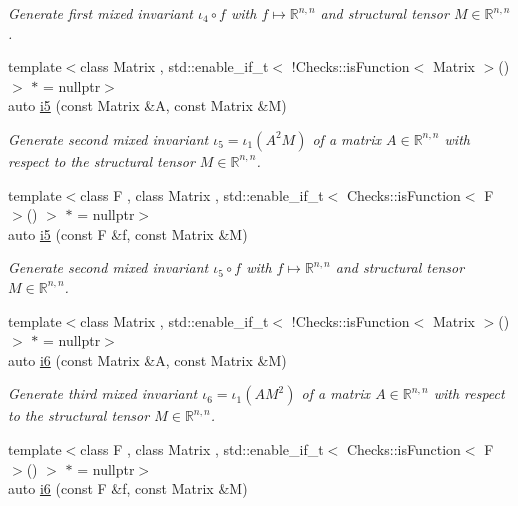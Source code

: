 \begin{DoxyCompactItemize}
\begin{DoxyCompactList}\small\item\em Generate first mixed invariant $ \iota_4\circ f $ with $f\mapsto\mathbb{R}^{n,n}$ and structural tensor $M\in\mathbb{R}^{n,n}$. \end{DoxyCompactList}\item 
{\footnotesize template$<$class Matrix , std\-::enable\-\_\-if\-\_\-t$<$ !\-Checks\-::is\-Function$<$ Matrix $>$() $>$ $\ast$  = nullptr$>$ }\\auto \hyperlink{group__InvariantGroup_ga848a942e66a1e2bd750d5e373e9a384e}{i5} (const Matrix \&A, const Matrix \&M)
\begin{DoxyCompactList}\small\item\em Generate second mixed invariant $ \iota_5=\iota_1(A^2M) $ of a matrix $A\in\mathbb{R}^{n,n}$ with respect to the structural tensor $M\in\mathbb{R}^{n,n}$. \end{DoxyCompactList}\item 
{\footnotesize template$<$class F , class Matrix , std\-::enable\-\_\-if\-\_\-t$<$ Checks\-::is\-Function$<$ F $>$() $>$ $\ast$  = nullptr$>$ }\\auto \hyperlink{group__InvariantGroup_ga5dcdde79eb75b3f69652f939ea8ef029}{i5} (const F \&f, const Matrix \&M)
\begin{DoxyCompactList}\small\item\em Generate second mixed invariant $ \iota_5\circ f $ with $f\mapsto\mathbb{R}^{n,n}$ and structural tensor $M\in\mathbb{R}^{n,n}$. \end{DoxyCompactList}\item 
{\footnotesize template$<$class Matrix , std\-::enable\-\_\-if\-\_\-t$<$ !\-Checks\-::is\-Function$<$ Matrix $>$() $>$ $\ast$  = nullptr$>$ }\\auto \hyperlink{group__InvariantGroup_gaa0c4c64776bb36124d6b5af013ff14b1}{i6} (const Matrix \&A, const Matrix \&M)
\begin{DoxyCompactList}\small\item\em Generate third mixed invariant $ \iota_6=\iota_1(AM^2) $ of a matrix $A\in\mathbb{R}^{n,n}$ with respect to the structural tensor $M\in\mathbb{R}^{n,n}$. \end{DoxyCompactList}\item 
{\footnotesize template$<$class F , class Matrix , std\-::enable\-\_\-if\-\_\-t$<$ Checks\-::is\-Function$<$ F $>$() $>$ $\ast$  = nullptr$>$ }\\auto \hyperlink{group__InvariantGroup_ga102395488a9c5a67af658d35dd45ee11}{i6} (const F \&f, const Matrix \&M)

\end{DoxyCompactItemize}
